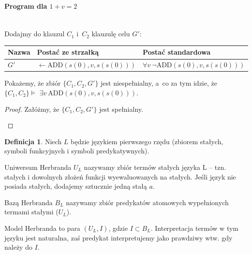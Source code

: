 \documentclass[10pt,a4paper]{article}
\theoremstyle{plain}
\theoremstyle{definition}
\newtheorem*{definition}{Definicja}
\begin{document}
\paragraph{Program dla $1+v = 2$}\mbox{}\\

Dodajmy do klauzul $C_1$ i~$C_2$ klauzulę celu $G'$:

\begin{center}\begin{tabular}{l | l | l}
  Nazwa & Postać ze strzałką & Postać standardowa \\
  \hline
  $G'$ & $\leftarrow \text{ADD}(s(0), v, s(s(0)))$ &
    $\forall v~\lnot \text{ADD}(s(0), v, s(s(0)))$ 
\end{tabular}\end{center}

Pokażemy, że zbiór $\lbrace C_1, C_2, G' \rbrace$ jest niespełnialny, a~co za tym
idzie, że $\lbrace C_1, C_2 \rbrace \models$\linebreak
$\exists v~\text{ADD}(s(0), v, s(s(0)))$.

\begin{proof}
  Załóżmy, że $\lbrace C_1, C_2, G' \rbrace$ jest spełnialny.

\begin{center}

\qedhere
\end{center}
\end{proof}

\begin{definition}
Niech $L$ będzie językiem pierwszego rzędu (zbiorem stałych, symboli funkcyjnych i symboli
predykatywnych).

Uniwersum Herbranda $U_L$ nazywamy zbiór termów stałych języka L -- tzn. stałych
i dowolnych złożeń funkcji wyewaluowanych na stałych. Jeśli język nie posiada stałych, dodajemy
sztucznie jedną stałą $a$.

Bazą Herbranda $B_L$ nazywamy zbiór predykatów atomowych wypełnionych termami stałymi ($U_L$).

Model Herbranda to para $(U_L, I)$, gdzie $I \subset B_L$. Interpretacja termów w tym języku
jest naturalna, zaś predykat interpretujemy jako prawdziwy wtw. gdy należy do $I$.
\end{definition}
\end{document}
